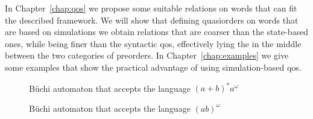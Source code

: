 In Chapter~\ref{chap:qos} we propose some suitable
relations on words that can fit the described framework.
We will show that defining quasiorders on words that are based on simulations
we obtain relations that are coarser than the state-based ones,
while being finer than the syntactic qos, effectively lying the in
the middle between the two categories of preorders.
In Chapter~\ref{chap:examples} we give some examples that show the practical
advantage of using simulation-based qos.

\begin{figure}[h]
\centering
{}
\caption{B{\"u}chi automaton that accepts the language $(a+b)^*a^{\omega}$}
\label{fig:BA-example-2}
\end{figure}

\begin{figure}[h]
\centering
{}
\caption{B{\"u}chi automaton that accepts the language $(ab)^{\omega}$}
\label{fig:BA-example-3}
\end{figure}

